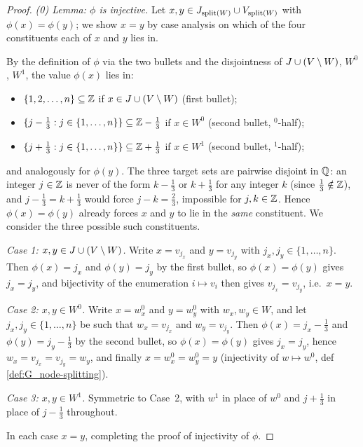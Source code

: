 \documentclass[main]{subfiles}
\begin{document}
\begin{proof}
\medskip\noindent\emph{(0) Lemma: $\phi$ is injective.}
Let $x, y \in J_{\mathrm{split}(W)} \cup V_{\mathrm{split}(W)}$ with $\phi(x) = \phi(y)$; we show $x = y$ by case analysis on which of the four constituents each of $x$ and $y$ lies in.

By the definition of $\phi$ via the two bullets and the disjointness of $J \cup (V \setminus W)$, $W^0$, $W^1$, the value $\phi(x)$ lies in:
\begin{itemize}
    \item $\{1, 2, \dots, n\} \subseteq \mathbb{Z}$ if $x \in J \cup (V \setminus W)$ (first bullet);
    \item $\{j - \tfrac{1}{3} : j \in \{1, \dots, n\}\} \subseteq \mathbb{Z} - \tfrac{1}{3}$ if $x \in W^0$ (second bullet, $^0$-half);
    \item $\{j + \tfrac{1}{3} : j \in \{1, \dots, n\}\} \subseteq \mathbb{Z} + \tfrac{1}{3}$ if $x \in W^1$ (second bullet, $^1$-half);
\end{itemize}
and analogously for $\phi(y)$. The three target sets are pairwise disjoint in $\mathbb{Q}$: an integer $j \in \mathbb{Z}$ is never of the form $k - \tfrac{1}{3}$ or $k + \tfrac{1}{3}$ for any integer $k$ (since $\tfrac{1}{3} \notin \mathbb{Z}$), and $j - \tfrac{1}{3} = k + \tfrac{1}{3}$ would force $j - k = \tfrac{2}{3}$, impossible for $j, k \in \mathbb{Z}$. Hence $\phi(x) = \phi(y)$ already forces $x$ and $y$ to lie in the \emph{same} constituent. We consider the three possible such constituents.

\emph{Case 1: $x, y \in J \cup (V \setminus W)$.} Write $x = v_{j_x}$ and $y = v_{j_y}$ with $j_x, j_y \in \{1, \dots, n\}$. Then $\phi(x) = j_x$ and $\phi(y) = j_y$ by the first bullet, so $\phi(x) = \phi(y)$ gives $j_x = j_y$, and bijectivity of the enumeration $i \mapsto v_i$ then gives $v_{j_x} = v_{j_y}$, i.e.\ $x = y$.

\emph{Case 2: $x, y \in W^0$.} Write $x = w_x^0$ and $y = w_y^0$ with $w_x, w_y \in W$, and let $j_x, j_y \in \{1, \dots, n\}$ be such that $w_x = v_{j_x}$ and $w_y = v_{j_y}$. Then $\phi(x) = j_x - \tfrac{1}{3}$ and $\phi(y) = j_y - \tfrac{1}{3}$ by the second bullet, so $\phi(x) = \phi(y)$ gives $j_x = j_y$, hence $w_x = v_{j_x} = v_{j_y} = w_y$, and finally $x = w_x^0 = w_y^0 = y$ (injectivity of $w \mapsto w^0$, def \ref{def:G_node-splitting}).

\emph{Case 3: $x, y \in W^1$.} Symmetric to Case~2, with $w^1$ in place of $w^0$ and $j + \tfrac{1}{3}$ in place of $j - \tfrac{1}{3}$ throughout.

In each case $x = y$, completing the proof of injectivity of $\phi$.


\end{proof}
\end{document}
